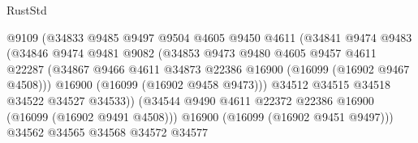 \begin{lexlean}{RustStd}
\begin{coremodule}
                                      @9109
                                      (@34833
                                        @9485
                                        @9497
                                        @9504
                                        @4605
                                        @9450
                                        @4611
                                        (@34841
                                          @9474
                                          @9483
                                          (@34846
                                            @9474
                                            @9481
                                            @9082
                                            (@34853
                                              @9473
                                              @9480
                                              @4605
                                              @9457
                                              @4611
                                              @22287
                                              (@34867
                                                @9466
                                                @4611
                                                @34873
                                                @22386
                                                @16900
                                                (@16099 (@16902 @9467 @4508)))
                                              @16900
                                              (@16099 (@16902 @9458 @9473)))
                                            @34512
                                            @34515
                                            @34518
                                            @34522
                                            @34527
                                            @34533))
                                        (@34544
                                          @9490
                                          @4611
                                          @22372
                                          @22386
                                          @16900
                                          (@16099 (@16902 @9491 @4508)))
                                        @16900
                                        (@16099 (@16902 @9451 @9497)))
                                      @34562
                                      @34565
                                      @34568
                                      @34572
                                      @34577

\end{coremodule}
\end{lexlean}
